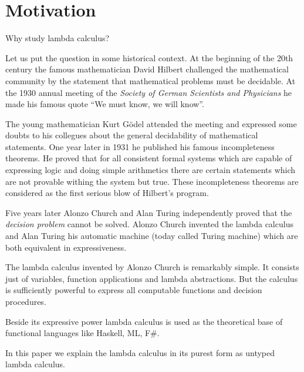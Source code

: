 \section{Motivation}

Why study lambda calculus?

Let us put the question in some historical context. At the beginning of the
20th century the famous mathematician David Hilbert challenged the
mathematical community by the statement that mathematical problems must be
decidable. At the 1930 annual meeting of the \emph{Society of German
  Scientists and Physicians} he made his famous quote ``We must know, we will
know''.

\noindent
{}


The young mathematician Kurt Gödel attended the meeting and expressed some
doubts to his collegues about the general decidability of mathematical
statements. One year later in 1931 he published his famous incompleteness
theorems. He proved that for all consistent formal systems which are capable
of expressing logic and doing simple arithmetics there are certain statements
which are not provable withing the system but true. These incompleteness
theorems are considered as the first serious blow of Hilbert's program.

Five years later Alonzo Church and Alan Turing independently proved that the
\emph{decision problem} cannot be solved. Alonzo Church invented the lambda
calculus and Alan Turing his automatic machine (today called Turing machine)
which are both equivalent in expressiveness.

The lambda calculus invented by Alonzo Church is remarkably simple. It
consists just of variables, function applications and lambda abstractions. But
the calculus is sufficiently powerful to express all computable functions and
decision procedures.

Beside its expressive power lambda calculus is used as the theoretical base of
functional languages like Haskell, ML, F\#.

In this paper we explain the lambda calculus in its purest form as untyped
lambda calculus.
